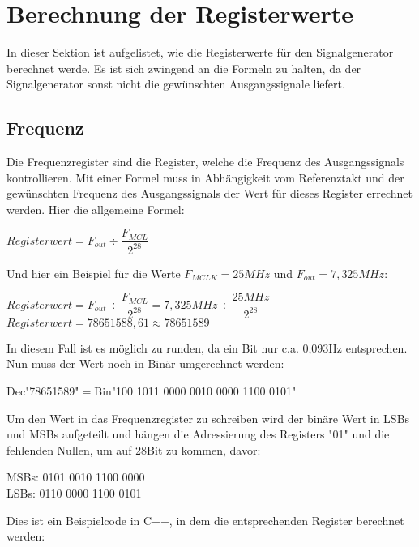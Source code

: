 \documentclass[a4paper,12pt]{article}
\begin{document}
\section{Berechnung der Registerwerte}
In dieser Sektion ist aufgelistet, wie die Registerwerte für den Signalgenerator berechnet werde. Es ist sich zwingend an die Formeln zu halten, da der Signalgenerator sonst nicht die gewünschten Ausgangssignale liefert.
\subsection{Frequenz}
Die Frequenzregister sind die Register, welche die Frequenz des Ausgangssignals kontrollieren. Mit einer Formel muss in Abhängigkeit vom Referenztakt und der gewünschten Frequenz des Ausgangssignals der Wert für dieses Register errechnet werden. Hier die allgemeine Formel:\\

\begin{center}
$Registerwert=F_{out}\div \dfrac{F_{MCL}}{2^{28}}$\\
\end{center}
Und hier ein Beispiel für die Werte $F_{MCLK}=25MHz$ und $F_{out}= 7,325MHz$:\\
\begin{center}
$Registerwert=F_{out}\div \dfrac{F_{MCL}}{2^{28}}=7,325MHz\div \dfrac{25MHz}{2^{28}}$\\
\medskip
$Registerwert=78651588,61 \approx 78651589$\\
\end{center}
In diesem Fall ist es möglich zu runden, da ein Bit nur c.a. 0,093Hz entsprechen. Nun muss der Wert noch in Binär umgerechnet werden:\\
\begin{center}
Dec"78651589"$ = $Bin"100 1011 0000 0010 0000 1100 0101"\\
\end{center}
Um den Wert in das Frequenzregister zu schreiben wird der binäre Wert in LSBs und MSBs aufgeteilt und hängen die Adressierung des Registers "01" und die fehlenden Nullen, um auf 28Bit zu kommen, davor:
\begin{center}
MSBs: 0101 0010 1100 0000\\
LSBs: 0110 0000 1100 0101\\
\end{center}
\pagebreak
Dies ist ein Beispielcode in C++, in dem die entsprechenden Register berechnet werden:
\lstset{style=C}

\end{document}
